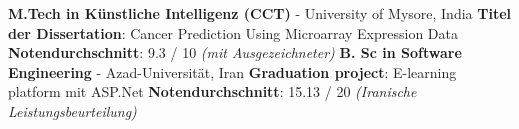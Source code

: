 %
%
%

\vspace{1em}

\begin{scholarship}
	{
		\textbf{M.Tech in Künstliche Intelligenz (CCT)} - University of Mysore, India \newline
		\textbf{Titel der Dissertation}: Cancer Prediction Using Microarray Expression Data \newline
		\textbf{Notendurchschnitt}: 9.3 / 10 \textit{(mit Ausgezeichneter) }\newline
	}
	{
		\textbf{B. Sc in Software Engineering} - Azad-Universität, Iran \newline
		\textbf{Graduation project}: E-learning platform mit ASP.Net \newline
		\textbf{Notendurchschnitt}: 15.13 / 20 \textit{(Iranische Leistungsbeurteilung)}  \newline
	}
\end{scholarship}